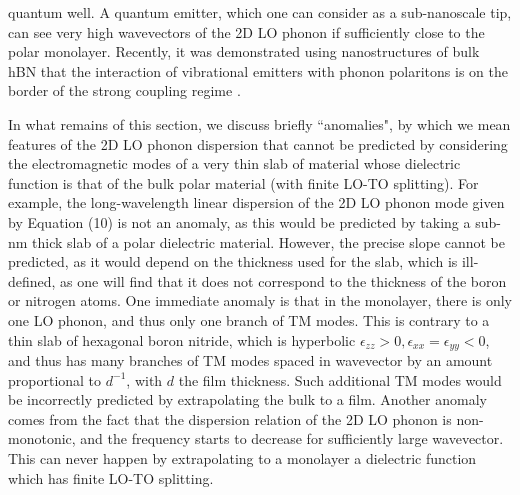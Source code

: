 \documentclass[aps,prb,twocolumn,
groupedaddress,superscriptaddress,
amsfonts,amssymb,amsmath,floatfix,
citeautoscript]{revtex4-1}
\begin{document}
quantum well. A quantum emitter, which one can consider as a sub-nanoscale tip, can see very high wavevectors of the 2D LO phonon if sufficiently close to the polar monolayer. Recently, it was demonstrated using nanostructures of bulk hBN that the interaction of vibrational emitters with phonon polaritons is on the border of the strong coupling regime \cite{autore2018boron}.
	
	In what remains of this section, we discuss briefly ``anomalies", by which we mean features of the 2D LO phonon dispersion that cannot be predicted by considering the electromagnetic modes of a very thin slab of material whose dielectric function is that of the bulk polar material (with finite LO-TO splitting). For example, the long-wavelength linear dispersion of the 2D LO phonon mode given by Equation (10) is not an anomaly, as this would be predicted by taking a sub-nm thick slab of a polar dielectric material. However, the precise slope cannot be predicted, as it would depend on the thickness used for the slab, which is ill-defined, as one will find that it does not correspond to the thickness of the boron or nitrogen atoms. One immediate anomaly is that in the monolayer, there is only one LO phonon, and thus only one branch of TM modes. This is contrary to a thin slab of hexagonal boron nitride, which is hyperbolic $\epsilon_{zz} > 0, \epsilon_{xx} = \epsilon_{yy} < 0$, and thus has many branches of TM modes spaced in wavevector by an amount proportional to $d^{-1}$, with $d$ the film thickness. Such additional TM modes would be incorrectly predicted by extrapolating the bulk to a film. Another anomaly comes from the fact that the dispersion relation of the 2D LO phonon is non-monotonic, and the frequency starts to decrease for sufficiently large wavevector. This can never happen by extrapolating to a monolayer a dielectric function which has finite LO-TO splitting. 
	
\end{document}
